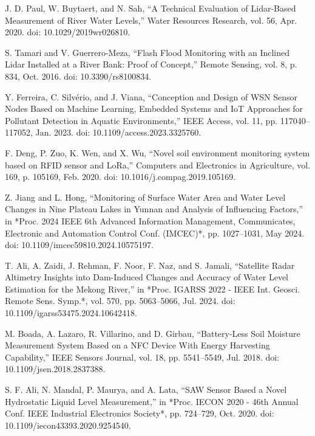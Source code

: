 \documentclass[conference]{IEEEtran}
\begin{document}
\begin{thebibliography}{00}
 J. D. Paul, W. Buytaert, and N. Sah, 
``A Technical Evaluation of Lidar-Based Measurement of River Water Levels,'' 
Water Resources Research, vol. 56, Apr. 2020. doi: 10.1029/2019wr026810.

 S. Tamari and V. Guerrero-Meza, 
``Flash Flood Monitoring with an Inclined Lidar Installed at a River Bank: Proof of Concept,'' 
Remote Sensing, vol. 8, p. 834, Oct. 2016. doi: 10.3390/rs8100834.

 Y. Ferreira, C. Silvério, and J. Viana, 
``Conception and Design of WSN Sensor Nodes Based on Machine Learning, Embedded Systems and IoT Approaches for Pollutant Detection in Aquatic Environments,'' 
IEEE Access, vol. 11, pp. 117040--117052, Jan. 2023. doi: 10.1109/access.2023.3325760.

 F. Deng, P. Zuo, K. Wen, and X. Wu, 
``Novel soil environment monitoring system based on RFID sensor and LoRa,'' 
Computers and Electronics in Agriculture, vol. 169, p. 105169, Feb. 2020. doi: 10.1016/j.compag.2019.105169.

 Z. Jiang and L. Hong, 
``Monitoring of Surface Water Area and Water Level Changes in Nine Plateau Lakes in Yunnan and Analysis of Influencing Factors,'' 
in *Proc. 2024 IEEE 6th Advanced Information Management, Communicates, Electronic and Automation Control Conf. (IMCEC)*, 
pp. 1027--1031, May 2024. doi: 10.1109/imcec59810.2024.10575197.

 T. Ali, A. Zaidi, J. Rehman, F. Noor, F. Naz, and S. Jamali, 
``Satellite Radar Altimetry Insights into Dam-Induced Changes and Accuracy of Water Level Estimation for the Mekong River,'' 
in *Proc. IGARSS 2022 - IEEE Int. Geosci. Remote Sens. Symp.*, vol. 570, pp. 5063--5066, Jul. 2024. 
doi: 10.1109/igarss53475.2024.10642418.


 M. Boada, A. Lazaro, R. Villarino, and D. Girbau, 
``Battery-Less Soil Moisture Measurement System Based on a NFC Device With Energy Harvesting Capability,'' 
IEEE Sensors Journal, vol. 18, pp. 5541--5549, Jul. 2018. 
doi: 10.1109/jsen.2018.2837388.

 S. F. Ali, N. Mandal, P. Maurya, and A. Lata, 
``SAW Sensor Based a Novel Hydrostatic Liquid Level Measurement,'' 
in *Proc. IECON 2020 - 46th Annual Conf. IEEE Industrial Electronics Society*, pp. 724--729, Oct. 2020. 
doi: 10.1109/iecon43393.2020.9254540.


\end{thebibliography}
\end{document}
